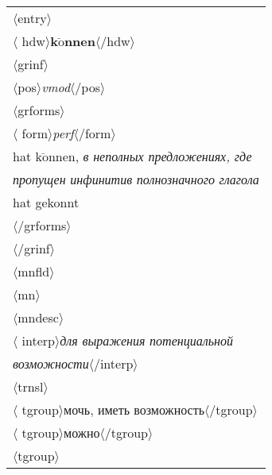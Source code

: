 \begin{multicols}{2}
\noindent
  {\small 
  \begin{tabular}{l}
  $\langle${\sf entry}$\rangle$\\
  $\langle${\sf 
hdw}$\rangle$\textbf{k$\ddot{\mbox{o}}$nnen}$\langle$/{\sf hdw}$\rangle$
  \\
  $\langle${\sf grinf}$\rangle$\\
  \hspace*{3mm}$\langle${\sf pos}$\rangle$\textit{vmod}$\langle$/{\sf pos}$\rangle$\\
  \hspace*{3mm}$\langle${\sf grforms}$\rangle$\\
  \hspace*{6mm}$\langle${\sf 
form}$\rangle$\textit{perf}$\langle$/{\sf form}$\rangle$\\
  \hspace*{8mm}hat k$\ddot{\mbox{o}}$nnen, \textit{в неполных 
предложениях, где}\\ 
\hspace*{8mm}\textit{пропущен инфинитив полнозначного глагола}\\
\hspace*{8mm}hat  gekonnt\\
  \hspace*{3mm}$\langle$/{\sf grforms}$\rangle$\\
  $\langle$/{\sf grinf}$\rangle$\\
  $\langle${\sf mnfld}$\rangle$\\
  \hspace*{3mm}$\langle${\sf mn}$\rangle$\\
  \hspace*{6mm}$\langle${\sf mndesc}$\rangle$\\
  \hspace*{10mm}$\langle${\sf 
interp}$\rangle$\textit{для выражения 
потенциальной}\\
\hspace*{10mm}\textit{возможности}$\langle$/{\sf interp}$\rangle$\\
  \hspace*{8mm}$\langle${\sf trnsl}$\rangle$\\
  \hspace*{10mm}$\langle${\sf 
tgroup}$\rangle$мочь, иметь 
возможность$\langle$/{\sf tgroup}$\rangle$\\
  \hspace*{10mm}$\langle${\sf 
tgroup}$\rangle$можно$\langle$/{\sf tgroup}$\rangle$\\
  \hspace*{10mm}$\langle${\sf tgroup}$\rangle$\\

\end{tabular}}
\end{multicols}
